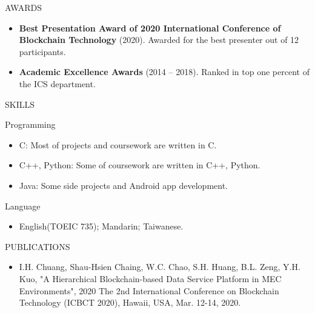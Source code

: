 \documentclass[]{mcdowellcv}
\begin{document}
	\begin{cvsection}{AWARDS}
		\begin{cvsubsection}{}{}{}	
			\begin{itemize}
				\item \textbf{Best Presentation Award of 2020 International Conference of Blockchain Technology} (2020). Awarded for the best presenter out of 12 participants.
				\item \textbf{Academic Excellence Awards} (2014 -- 2018). Ranked in top one percent of the ICS department.
			\end{itemize}
		\end{cvsubsection}
	\end{cvsection}
	
	\begin{cvsection}{SKILLS}
		\begin{cvsubsection}{Programming}{}{}	
			\begin{itemize}
				\item C: Most of projects and coursework are written in C.
				\item C++, Python: Some of coursework are written in C++, Python.
				\item Java: Some side projects and Android app development.
			\end{itemize}
		\end{cvsubsection}
		\begin{cvsubsection}{Language}{}{}	
			\begin{itemize}
				\item English(TOEIC 735); Mandarin; Taiwanese.
			\end{itemize}
		\end{cvsubsection}
	\end{cvsection}
	
	\begin{cvsection}{PUBLICATIONS}
		\begin{cvsubsection}{}{}{}	
		    \begin{itemize}
		        \item I.H. Chuang, Shau-Hsien Chaing, W.C. Chao, S.H. Huang, B.L. Zeng, Y.H. Kuo, "A Hierarchical Blockchain-based Data Service Platform in MEC Environments", 2020 The 2nd International Conference on Blockchain Technology (ICBCT 2020), Hawaii, USA, Mar. 12-14, 2020.
		    \end{itemize}

		\end{cvsubsection}
	\end{cvsection}
\end{document}
